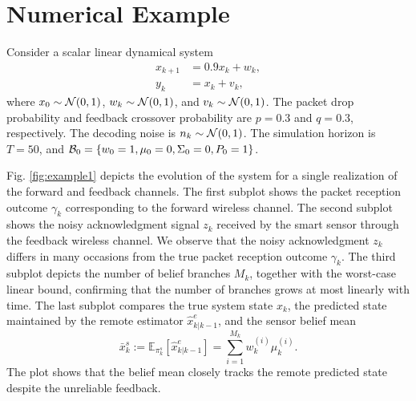 \documentclass[letterpaper, 10 pt, conference]{ieeeconf}
\begin{document}
\section{Numerical Example}\label{num.example}
Consider a scalar linear dynamical system
\begin{align*}
    x_{k+1}&=0.9x_k+w_k,\\
    y_k&=x_k+v_k,
\end{align*}
where $x_0\sim {\cal N}(0,1)$, $w_k\sim {\cal N}(0,1)$, and $v_k\sim {\cal N}(0,1)$. The packet drop probability and feedback crossover probability are $p=0.3$ and $q=0.3$, respectively. The decoding noise is $n_k\sim {\cal N}(0,1)$. The simulation horizon is $T=50$, and  ${\cal B}_0=\{w_0=1,\mu_0=0,\Sigma_0=0,P_0=1\}$.


Fig. \ref{fig:example1} depicts the evolution of the system for a single realization of the forward and feedback channels. The first subplot shows the packet reception outcome $\gamma_k$ corresponding to the forward wireless channel. The second subplot shows the noisy acknowledgment signal $z_k$ received by the smart sensor through the feedback wireless channel. We observe that the noisy acknowledgment $z_k$ differs in many occasions from the true packet reception outcome $\gamma_k$. 
The third subplot depicts the number of belief branches $M_k$, together with the worst-case linear bound, confirming that the number of branches grows at most linearly with time.  The last subplot compares the true system state $x_k$, the predicted state maintained by the remote estimator $\hat{x}^e_{k|k-1}$, and the sensor belief mean 
\begin{equation*}
    \bar{x}^s_{k}:=\mathbb{E}_{\pi_k^s}[\hat{x}^e_{k|k-1}]=\sum_{i=1}^{M_k} w_k^{(i)}\mu_k^{(i)}.
\end{equation*}
The plot shows that the belief mean closely tracks the remote predicted state despite the unreliable feedback.
\end{document}

